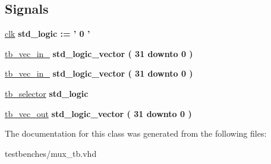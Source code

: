 \subsection*{\-Signals}
 \begin{DoxyCompactItemize}
\item 
\hypertarget{classmux__tb_1_1behavior_aa4a50c298077fcba21ee7b8037fae196}{\hyperlink{classmux__tb_1_1behavior_aa4a50c298077fcba21ee7b8037fae196}{clk} {\bfseries std\-\_\-logic  \-:= '  0  ' } }\label{classmux__tb_1_1behavior_aa4a50c298077fcba21ee7b8037fae196}

\item 
\hypertarget{classmux__tb_1_1behavior_aafcce8e7a57f78ec316c2d09baaf938d}{\hyperlink{classmux__tb_1_1behavior_aafcce8e7a57f78ec316c2d09baaf938d}{tb\-\_\-vec\-\_\-in\-\_} {\bfseries std\-\_\-logic\-\_\-vector (   31    downto    0  ) } }\label{classmux__tb_1_1behavior_aafcce8e7a57f78ec316c2d09baaf938d}

\item 
\hypertarget{classmux__tb_1_1behavior_ab2752542a9d10d877b272c9484b29df9}{\hyperlink{classmux__tb_1_1behavior_ab2752542a9d10d877b272c9484b29df9}{tb\-\_\-vec\-\_\-in\-\_} {\bfseries std\-\_\-logic\-\_\-vector (   31    downto    0  ) } }\label{classmux__tb_1_1behavior_ab2752542a9d10d877b272c9484b29df9}

\item 
\hypertarget{classmux__tb_1_1behavior_a25ec99ba02878236496471f1c0b4aca1}{\hyperlink{classmux__tb_1_1behavior_a25ec99ba02878236496471f1c0b4aca1}{tb\-\_\-selector} {\bfseries std\-\_\-logic } }\label{classmux__tb_1_1behavior_a25ec99ba02878236496471f1c0b4aca1}

\item 
\hypertarget{classmux__tb_1_1behavior_a1ef2cbfab26351585dd50c0f22be5fa6}{\hyperlink{classmux__tb_1_1behavior_a1ef2cbfab26351585dd50c0f22be5fa6}{tb\-\_\-vec\-\_\-out} {\bfseries std\-\_\-logic\-\_\-vector (   31    downto    0  ) } }\label{classmux__tb_1_1behavior_a1ef2cbfab26351585dd50c0f22be5fa6}

\end{DoxyCompactItemize}


\-The documentation for this class was generated from the following files\-:\begin{DoxyCompactItemize}
\item 
testbenches/mux\-\_\-tb.\-vhd\end{DoxyCompactItemize}
